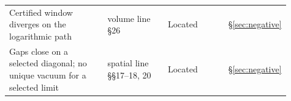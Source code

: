 \begin{center}
\begin{longtable}{@{}>{\raggedright\arraybackslash}p{0.36\linewidth}>{\raggedright\arraybackslash}p{0.22\linewidth}>{\raggedright\arraybackslash}p{0.22\linewidth}>{\raggedright\arraybackslash}p{0.11\linewidth}@{}}
Certified window diverges on the logarithmic path & volume line §26 & Located & §\ref{sec:negative}\\
Gaps close on a selected diagonal; no unique vacuum for a selected limit & spatial line §§17--18, 20 & Located & §\ref{sec:negative}\\
\bottomrule
\end{longtable}
\end{center}
